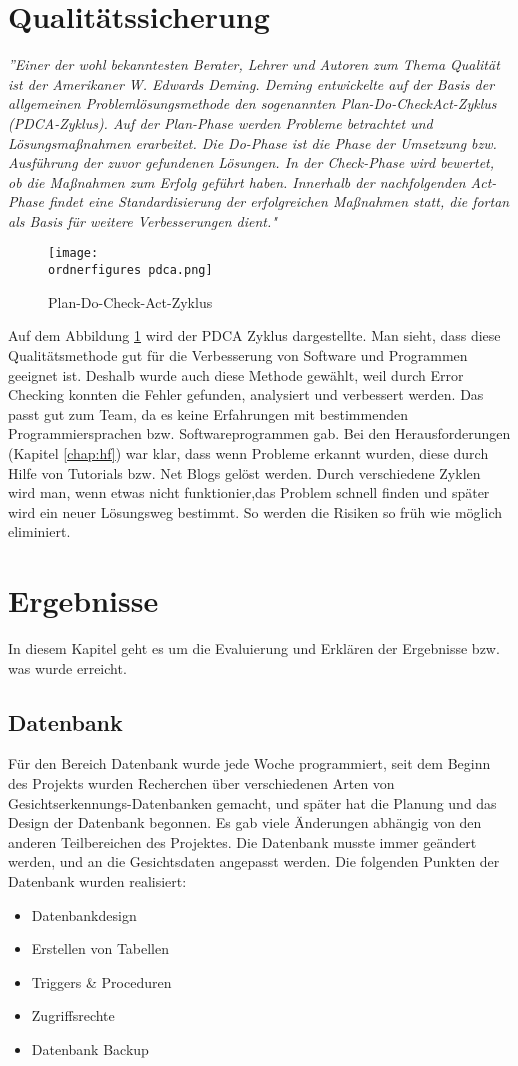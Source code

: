 \section{Qualitätssicherung}
\textit{''Einer der wohl bekanntesten Berater, Lehrer und Autoren zum Thema Qualität ist der Amerikaner W. Edwards Deming. Deming
entwickelte auf der Basis der allgemeinen Problemlösungsmethode den sogenannten Plan-Do-CheckAct-Zyklus (PDCA-Zyklus). Auf der Plan-Phase werden Probleme betrachtet und Lösungsmaßnahmen
erarbeitet. Die Do-Phase ist die Phase der Umsetzung bzw. Ausführung der zuvor gefundenen
Lösungen. In der Check-Phase wird bewertet, ob die Maßnahmen zum Erfolg geführt haben.
Innerhalb der nachfolgenden Act-Phase findet eine Standardisierung der erfolgreichen Maßnahmen
statt, die fortan als Basis für weitere Verbesserungen dient."}\cite{PDCA-Zyklus}
\bigbreak 
\begin{figure}[!htb]
  \centering
    \texttt{[image: \\ordnerfigures pdca.png]}
      \caption{Plan-Do-Check-Act-Zyklus \cite{PDCA-Zyklus}}
    \label{fig:pdca}
\end{figure}
Auf dem Abbildung \ref{fig:pdca} wird der PDCA Zyklus dargestellte. Man sieht, dass diese Qualitätsmethode gut für die Verbesserung von Software und Programmen geeignet ist. Deshalb wurde auch diese Methode gewählt, weil durch Error Checking konnten die Fehler gefunden, analysiert und verbessert werden. Das passt gut zum Team, da es keine Erfahrungen mit bestimmenden Programmiersprachen bzw. Softwareprogrammen gab.
\bigbreak
Bei den Herausforderungen (Kapitel \ref{chap:hf}) war klar, dass wenn Probleme erkannt wurden, diese durch Hilfe von Tutorials bzw. Net Blogs gelöst werden. Durch verschiedene Zyklen wird man, wenn etwas nicht funktionier,das Problem  schnell finden und später wird ein neuer Lösungsweg bestimmt. So werden die Risiken so früh wie möglich eliminiert.

\newpage
\section{Ergebnisse}
In diesem Kapitel geht es um die Evaluierung und Erklären der Ergebnisse bzw. was wurde erreicht.
\subsection{Datenbank}
Für den Bereich Datenbank wurde jede Woche programmiert, seit dem Beginn des Projekts wurden Recherchen über verschiedenen Arten von Gesichtserkennungs-Datenbanken gemacht, und später hat die Planung und das Design der Datenbank begonnen. Es gab viele Änderungen abhängig von den anderen Teilbereichen des Projektes. Die Datenbank musste immer geändert werden, und an die Gesichtsdaten angepasst werden. Die folgenden Punkten der Datenbank wurden realisiert:
\begin{itemize}
	\item Datenbankdesign
	\item Erstellen von Tabellen
	\item Triggers \& Proceduren
	\item Zugriffsrechte
	\item Datenbank Backup
\end{itemize}
